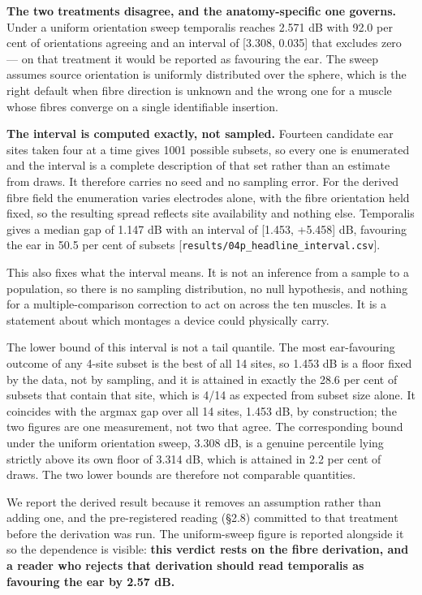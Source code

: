 \documentclass[
  11pt,
  a4paper,
]{article}
\begin{document}
\textbf{The two treatments disagree, and the anatomy-specific one governs.} Under a
uniform orientation sweep temporalis reaches \textminus{}2.571 dB with 92.0 per cent of
orientations agreeing and an interval of {[}\textminus{}3.308, \textminus{}0.035{]} that excludes zero ---
on that treatment it would be reported as favouring the ear. The sweep assumes
source orientation is uniformly distributed over the sphere, which is the right
default when fibre direction is unknown and the wrong one for a muscle whose
fibres converge on a single identifiable insertion.

\textbf{The interval is computed exactly, not sampled.} Fourteen candidate ear sites
taken four at a time gives 1001 possible subsets, so every one is enumerated and
the interval is a complete description of that set rather than an estimate from
draws. It therefore carries no seed and no sampling error. For the derived fibre
field the enumeration varies electrodes alone, with the fibre orientation held
fixed, so the resulting spread reflects site availability and nothing else.
Temporalis gives a median gap of \textminus{}1.147 dB with an interval of
{[}\textminus{}1.453, +5.458{]} dB, favouring the ear in 50.5 per cent of subsets
{[}\texttt{results/04p\_headline\_interval.csv}{]}.

This also fixes what the interval means. It is not an inference from a sample to
a population, so there is no sampling distribution, no null hypothesis, and
nothing for a multiple-comparison correction to act on across the ten muscles.
It is a statement about which montages a device could physically carry.

The lower bound of this interval is not a tail quantile. The most ear-favouring
outcome of any 4-site subset is the best of all 14 sites, so \textminus{}1.453 dB is a
floor fixed by the data, not by sampling, and it is attained in exactly the 28.6
per cent of subsets that contain that site, which is 4/14 as expected from
subset size alone. It coincides with the argmax gap over all 14 sites, \textminus{}1.453
dB, by construction; the two figures are one measurement, not two that agree.
The corresponding bound under the uniform orientation sweep, \textminus{}3.308 dB, is a
genuine percentile lying strictly above its own floor of \textminus{}3.314 dB, which is
attained in 2.2 per cent of draws. The two lower bounds are therefore not
comparable quantities.

We report the derived result because it removes an assumption rather than
adding one, and the pre-registered reading (§2.8) committed to that treatment
before the derivation was run. The uniform-sweep figure is reported alongside
it so the dependence is visible: \textbf{this verdict rests on the fibre derivation,
and a reader who rejects that derivation should read temporalis as favouring
the ear by 2.57 dB.}
\end{document}
